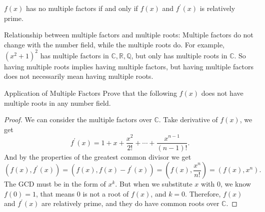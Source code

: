 \begin{corollary}{}{}
  $f(x)$ has no multiple factors if and only if $f(x)$ and $f^{\prime}(x)$ is
  relatively prime.
\end{corollary}

\begin{note}
  Relationship between multiple factors and multiple roots:
  Multiple factors do not change with the number field,
  while the multiple roots do.
  For example, $(x^2 + 1)^2$ has multiple factors in $\mathbb{C}, \mathbb{R}, \mathbb{Q}$,
  but only has multiple roots in $\mathbb{C}$.
  So having multiple roots implies having multiple factors,
  but having multiple factors does not necessarily mean having multiple roots.
\end{note}

\begin{example}{Application of Multiple Factors}{}
  Prove that the following $f(x)$ does not have multiple roots in any number field.
\end{example}

\begin{proof}
  We can consider the multiple factors over $\mathbb{C}$.
  Take derivative of $f(x)$, we get 
  \begin{equation}
    f^{\prime}(x) = 1 + x + \frac{x^2}{2!} + \cdots + \frac{x^{n-1}}{(n-1)!}.
  \end{equation}
  And by the properties of the greatest common divisor we get
  \begin{equation}
    (f(x), f^{\prime}(x)) = (f(x), f(x) - f^{\prime}(x))
    = (f(x), \frac{x^n}{n!}) = (f(x), x^n).
  \end{equation}
  The GCD must be in the form of $x^k$.
  But when we substitute $x$ with $0$, we know $f(0) = 1$,
  that means $0$ is not a root of $f(x)$, and $k = 0$.
  Therefore, $f(x)$ and $f^{\prime}(x)$ are relatively prime,
  and they do have common roots over $\mathbb{C}$.
\end{proof}

